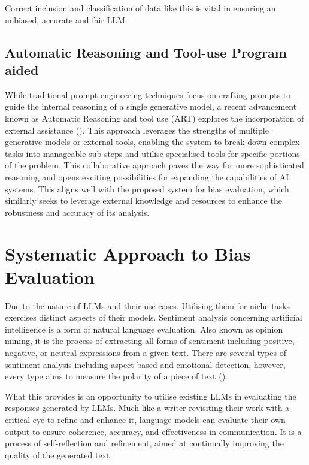 \documentclass[12pt]{article}
\begin{document}
Correct inclusion and classification of data like this is vital in ensuring an unbiased, accurate and fair LLM.

\subsection{Automatic Reasoning and Tool-use Program aided}

While traditional prompt engineering techniques focus on crafting prompts to guide the internal reasoning of a single generative model, a recent advancement known as Automatic Reasoning and tool use (ART) explores the incorporation of external assistance (\cite{paranjape-2023}). This approach leverages the strengths of multiple generative models or external tools, enabling the system to break down complex tasks into manageable sub-steps and utilise specialised tools for specific portions of the problem. This collaborative approach paves the way for more sophisticated reasoning and opens exciting possibilities for expanding the capabilities of AI systems. This aligns well with the proposed system for bias evaluation, which similarly seeks to leverage external knowledge and resources to enhance the robustness and accuracy of its analysis.

\newpage

\section{Systematic Approach to Bias Evaluation}

Due to the nature of LLMs and their use cases. Utilising them for niche tasks exercises distinct aspects of their models. Sentiment analysis concerning artificial intelligence is a form of natural language evaluation. Also known as opinion mining, it is the process of extracting all forms of sentiment including positive, negative, or neutral expressions from a given text. There are several types of sentiment analysis including aspect-based and emotional detection, however, every type aims to measure the polarity of a piece of text (\cite{ibm-2022}). 

What this provides is an opportunity to utilise existing LLMs in evaluating the responses generated by LLMs. Much like a writer revisiting their work with a critical eye to refine and enhance it, language models can evaluate their own output to ensure coherence, accuracy, and effectiveness in communication. It is a process of self-reflection and refinement, aimed at continually improving the quality of the generated text. 
\end{document}
